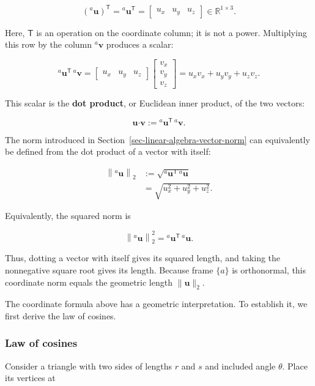 \documentclass[
  australian,
  12pt,
  letterpaper,
  DIV=11,
  numbers=noendperiod,
  twoside]{scrreprt}
\begin{document}
\[
\left({}^{a}\mathbf{u}\right)^\mathsf{T}
=
{}^{a}\mathbf{u}^\mathsf{T}
=
\begin{bmatrix}
u_x & u_y & u_z
\end{bmatrix}
\in\mathbb{R}^{1\times 3}.
\]

Here, \(\mathsf{T}\) is an operation on the coordinate column; it is not
a power. Multiplying this row by the column \({}^{a}\mathbf{v}\)
produces a scalar:

\[
{}^{a}\mathbf{u}^\mathsf{T}\,{}^{a}\mathbf{v}
=
\begin{bmatrix}
u_x & u_y & u_z
\end{bmatrix}
\begin{bmatrix}
v_x\\
v_y\\
v_z
\end{bmatrix}
=
u_xv_x+u_yv_y+u_zv_z.
\]

This scalar is the \textbf{dot product}, or Euclidean inner product, of
the two vectors:

\[
\mathbf{u}\boldsymbol{\cdot}\mathbf{v}
\mathrel{:=}
{}^{a}\mathbf{u}^\mathsf{T}\,{}^{a}\mathbf{v}.
\]

The norm introduced in Section~\ref{sec-linear-algebra-vector-norm} can
equivalently be defined from the dot product of a vector with itself:

\[
\begin{aligned}
\left\|{}^{a}\mathbf{u}\right\|_2
&\mathrel{:=}
\sqrt{{}^{a}\mathbf{u}^\mathsf{T}\,{}^{a}\mathbf{u}}\\
&=
\sqrt{u_x^2+u_y^2+u_z^2}.
\end{aligned}
\]

Equivalently, the squared norm is

\[
\left\|{}^{a}\mathbf{u}\right\|_2^2
=
{}^{a}\mathbf{u}^\mathsf{T}\,{}^{a}\mathbf{u}.
\]

Thus, dotting a vector with itself gives its squared length, and taking
the nonnegative square root gives its length. Because frame \(\{a\}\) is
orthonormal, this coordinate norm equals the geometric length
\(\|\mathbf{u}\|_2\).

The coordinate formula above has a geometric interpretation. To
establish it, we first derive the law of cosines.

\subsubsection{Law of cosines}\label{law-of-cosines}

Consider a triangle with two sides of lengths \(r\) and \(s\) and
included angle \(\theta\). Place its vertices at
\end{document}
